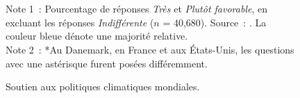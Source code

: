 \documentclass[a5paper,french,openany]{memoir}
\begin{document}
\begin{figure}[b!] %
  \caption[Soutien aux politiques climatiques mondiales]{Soutien aux politiques climatiques mondiales.} 
  \label{fig:oecd} %
  {\footnotesize \\ $\quad$ \\ Note 1~: Pourcentage de réponses \textit{Très} et \textit{Plutôt favorable}, en excluant les réponses \textit{Indifférent\textperiodcentered{}e} ($n$ = 40,680). Source~: \citet{fabre_international_2023}. %
  La couleur bleue dénote une majorité relative. %
  \\ Note 2~: *Au Danemark, en France et aux États-Unis, les questions avec une astérisque furent posées différemment. %
  } 
\end{figure}
\end{document}
